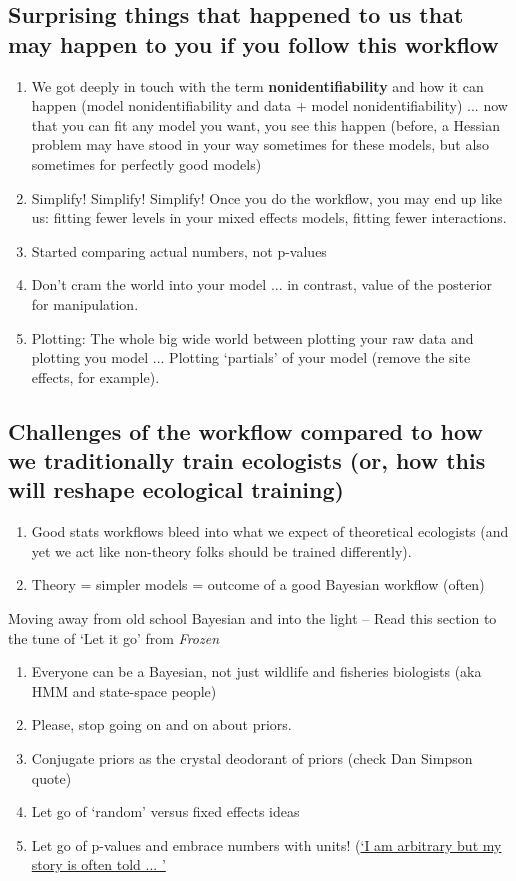 \documentclass[11pt]{article}
\begin{document}
\subsection{Surprising things that happened to us that may happen to you if you follow this workflow}

\begin{enumerate}
\item We got deeply in touch with the term {\bf nonidentifiability} and how it can happen (model nonidentifiability and data + model nonidentifiability) ... now that you can fit any model you want, you see this happen (before, a Hessian problem may have stood in your way sometimes for these models, but also sometimes for perfectly good models)
\item Simplify! Simplify! Simplify! Once you do the workflow, you may end up like us: fitting fewer levels in your mixed effects models, fitting fewer interactions.
\item Started comparing actual numbers, not p-values
\item Don't cram the world into your model ... in contrast, value of the posterior for manipulation. 
\item Plotting: The whole big wide world between plotting your raw data and plotting you model ... Plotting `partials' of your model (remove the site effects, for example).
\end{enumerate}

\subsection{Challenges of the workflow compared to how we traditionally train ecologists (or, how this will reshape ecological training)}

\begin{enumerate}
\item Good stats workflows bleed into what we expect of theoretical ecologists (and yet we act like non-theory folks should be trained differently). 
\item Theory = simpler models = outcome of a good Bayesian workflow (often)
\end{enumerate}

Moving away from old school Bayesian and into the light -- Read this section to the tune of `Let it go' from \emph{Frozen} 
\begin{enumerate}
\item Everyone can be a Bayesian, not just wildlife and fisheries biologists (aka HMM and state-space people)
\item Please, stop going on and on about priors. 
\item Conjugate priors as the crystal deodorant of priors (check Dan Simpson quote)
\item Let go of `random' versus fixed effects ideas
\item Let go of p-values and embrace numbers with units! (\href{https://www.youtube.com/watch?v=c3hxhv0lpI0}{`I am arbitrary but my story is often told ... '}
\end{enumerate}
\end{document}
